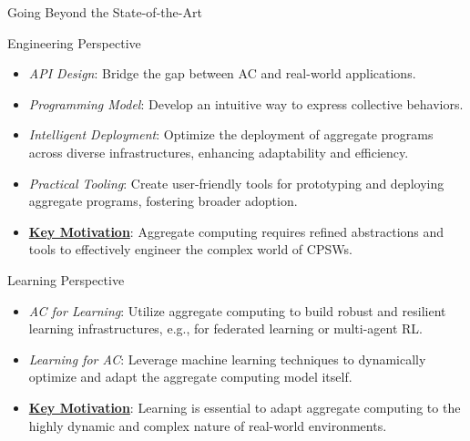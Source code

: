\documentclass[presentation, 8pt,169]{beamer}\mode<presentation>{\usetheme{AMSBolognaFC}}
\begin{document}
\begin{frame}{Going Beyond the State-of-the-Art}

  \begin{alertblock}{Engineering Perspective}
    \begin{itemize}
        \item \emph{API Design}: Bridge the gap between AC and real-world applications.
        \item \emph{Programming Model}: Develop an intuitive way to express collective behaviors.
        \item \emph{Intelligent Deployment}: Optimize the deployment of aggregate programs across diverse infrastructures, enhancing adaptability and efficiency.
        \item \emph{Practical Tooling}: Create user-friendly tools for prototyping and deploying aggregate programs, fostering broader adoption.
        \item \textbf{\underline{Key Motivation}}: Aggregate computing requires refined abstractions and tools to effectively engineer the complex world of CPSWs.
    \end{itemize}
  \end{alertblock}

  \begin{alertblock}{Learning Perspective}
    \begin{itemize}
        \item \emph{AC for Learning}: Utilize aggregate computing to build robust and resilient learning infrastructures, e.g., for federated learning or multi-agent RL.
        \item \emph{Learning for AC}: Leverage machine learning techniques to dynamically optimize and adapt the aggregate computing model itself.
        \item \textbf{\underline{Key Motivation}}: Learning is essential to adapt aggregate computing to the highly dynamic and complex nature of real-world environments.
    \end{itemize}
  \end{alertblock}

\end{frame}
\end{document}
